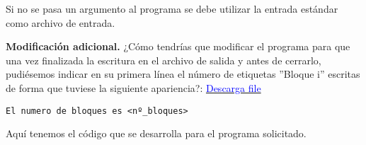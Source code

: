 Si no se pasa un argumento al programa se debe utilizar la entrada estándar como archivo de entrada. \newline

{\Large \textbf{Modificación adicional.}} ¿Cómo tendrías que modificar el programa para que una vez
finalizada la escritura en el archivo de salida y antes de cerrarlo, pudiésemos indicar en su
primera línea el número de etiquetas ''Bloque i'' escritas de forma que tuviese la siguiente
apariencia?: \href{file: file/ejercicio_2.c}{\textcolor{Blue}{Descarga file}}


\lstset{language=, breaklines=true, basicstyle=\footnotesize}
\begin{lstlisting}[frame=single]
	El numero de bloques es <nº_bloques>
\end{lstlisting}

Aquí tenemos el código que se desarrolla para el programa solicitado. 

